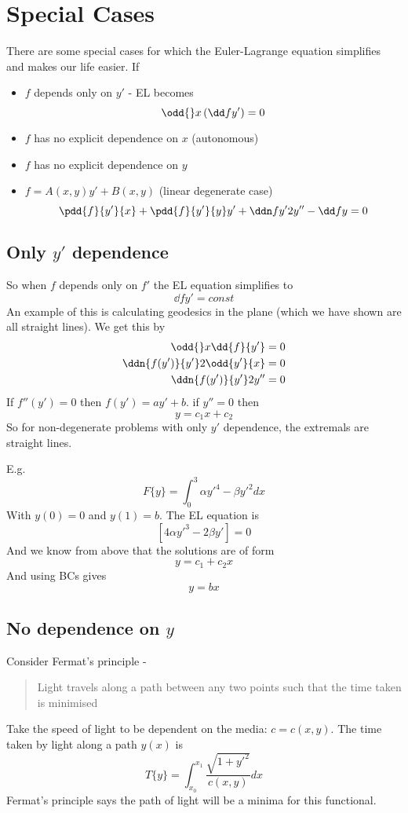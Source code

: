 \documentclass{X:/Documents/Coding/Latex/myassignment}
\begin{document}
\section{Special Cases}
There are some special cases for which the Euler-Lagrange equation simplifies and makes our life easier. If
\begin{itemize}
	\item $f$ depends only on $y'$ - EL becomes
	\[\odd{}x \left(\dd f{y'}\right) = 0\]
	\item $f$ has no explicit dependence on $x$ (autonomous) 
	\item $f$ has no explicit dependence on $y$ 
	\item $f = A(x,y)y' + B(x,y)$ (linear degenerate case)
	\[\pdd{f}{y'}{x} + \pdd{f}{y'}{y} y' + \ddn f{y'}2 y'' - \dd fy = 0\] 
\end{itemize}

\subsection{Only $y'$ dependence}
So when $f$ depends only on $f'$ the EL equation simplifies to
\[\dd f{y'} = const\]
An example of this is calculating geodesics in the plane (which we have shown are all straight lines).
We get this by
\begin{align*}
	\odd{}x \dd{f}{y'} =0\\
	\ddn{f(y')}{y'}2 \odd{y'}{x} = 0\\
	\ddn{f(y')}{y'}2 y'' = 0\\
\end{align*}
If $f''(y') = 0$ then $f(y') = ay' +b$. if $y'' = 0$ then
\[y = c_1 x + c_2\]
So for non-degenerate problems with only $y'$ dependence, the extremals are straight lines.

E.g.
\[F\{y\} = \int_0^3 \alpha y'^4 - \beta y'^2 dx\]
With $y(0) = 0$ and $y(1) = b$. The EL equation is
\[ \left[4 \alpha y'^3 - 2 \beta y'\right] = 0\]
And we know from above that the solutions are of form
\[y = c_1 + c_2x\]
And using BCs gives
\[y = bx\]

\subsection{No dependence on $y$}
Consider Fermat's principle - 
\begin{quote}
	Light travels along a path between any two points such that the time taken is minimised
\end{quote}
Take the speed of light to be dependent on the media: $c = c(x,y)$. The time taken by light along a path $y(x)$ is
\[T\{y\} = \int_{x_0}^{x_1} \frac{\sqrt{1+y'^2}}{c(x,y)} dx\]
Fermat's principle says the path of light will be a minima for this functional.
\end{document}
